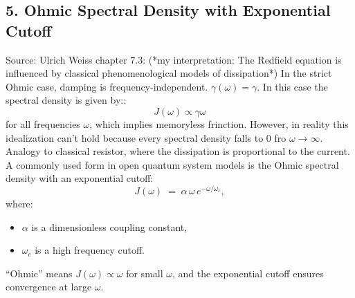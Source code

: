 \subsection*{5. Ohmic Spectral Density with Exponential Cutoff}
Source: Ulrich Weiss chapter 7.3:
(*my interpretation: The Redfield equation is influenced by classical phenomenological models of dissipation*)
In the strict Ohmic case, damping is frequency-independent. $ \gamma(\omega) = \gamma $. 
In this case the spectral density is given by::
\begin{equation}
  J(\omega) \propto \gamma \omega
\end{equation}
for all frequencies $\omega$, which implies memoryless frinction. 
However, in reality this idealization can't hold because every spectral density falls to 0 fro $\omega \to \infty$.
Analogy to classical resistor, where the dissipation is proportional to the current.\\

A commonly used form in open quantum system models is the Ohmic spectral density with an exponential cutoff:
\[
J(\omega) \;=\; \alpha \,\omega\, e^{-\omega/\omega_c},
\]
where:
\begin{itemize}
  \item $\alpha$ is a dimensionless coupling constant,
  \item $\omega_c$ is a high frequency cutoff.
\end{itemize}
``Ohmic'' means $J(\omega) \propto \omega$ for small $\omega$, and the exponential cutoff ensures convergence at large $\omega$.